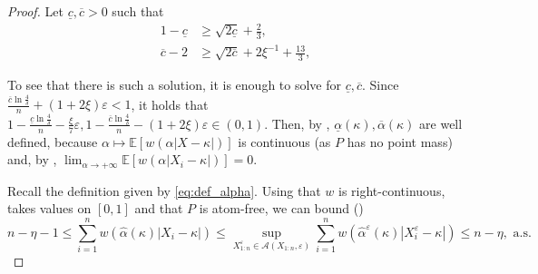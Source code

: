\documentclass{article}
\theoremstyle{plain}
\theoremstyle{definition}
\def\eps{\varepsilon}
\newcommand{\E}{\mathbb{E}} %
\def\sA{\mathcal{A}}
\begin{document}
\begin{appendix}
	{\renewcommand{\proofname}{Proof of \Cref{lemma:alphaorder}}
	\begin{proof}
		Let \( \underline{c}, \overline{c}>0 \) such that
		\begin{align*}
      1-\underline{c}&\ge  \sqrt{2\underline{c}} + \frac{2 }{3},\\
      \overline{c}-2&\ge \sqrt{2\overline{c}}+2\xi^{-1}+\frac{13}{3} , 
		\end{align*}

    To see that there is such a solution, it is enough to solve for \( \underline{c},\overline{c} \). Since \( \frac{\overline{c} \ln \frac{4}{\delta }}{n}+(1+2\xi )\eps < 1 \), it holds that \( 1-\frac{\underline{c}\ln \frac{4}{\delta } }{n}-\frac{\xi}{7}\varepsilon ,1-\frac{\overline{c} \ln \frac{4}{\delta }}{n}-(1+2\xi )\eps \in (0,1) \). Then, by , \( \underline{\alpha}(\kappa),\overline{\alpha}(\kappa) \) are well defined, because $\alpha\mapsto\E[w(\alpha \lvert  X-\kappa\rvert )]$ is continuous (as $P$ has no point mass) and, by , $\lim_{\alpha\to+\infty}\E[w(\alpha \lvert  X_i-\kappa\rvert )]=0$.

		Recall the definition given by \eqref{eq:def_alpha}. Using that $w$ is right-continuous, takes values on $[0,1]$ and that $P$ is atom-free, we can bound ()
    \[ n - \eta - 1 \leq \sum_{i=1}^n w(\widehat{\alpha}(\kappa) |X_i  - \kappa|) \le \sup_{X_{1:n}^\varepsilon \in \sA(X_{1:n},\varepsilon ) }\sum_{i=1}^n w(\widehat{\alpha}^\eps (\kappa) |X_i^\eps   - \kappa|) \leq n - \eta, \text{ a.s.} \]


\end{proof}}
\end{appendix}
\end{document}
